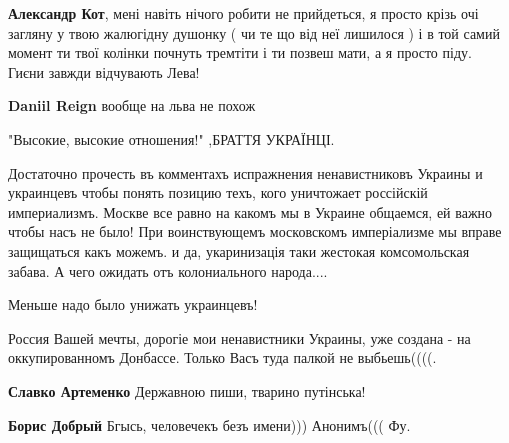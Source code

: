 \begin{itemize}
\begin{itemize}

\textbf{Александр Кот}, мені навіть нічого робити не прийдеться, я просто крізь очі загляну у твою жалюгідну душонку ( чи те що від неї лишилося ) і в той самий момент ти твої колінки почнуть тремтіти і ти позвеш мати, а я просто піду.
Гиєни завжди відчувають Лева!🦁


\textbf{Daniil Reign} вообще на льва не похож


"Высокие, высокие отношения!" ,БРАТТЯ УКРАЇНЦІ.

\end{itemize}



Достаточно прочесть въ комментахъ испражнения ненавистниковъ Украины и
украинцевъ чтобы понять позицию техъ, кого уничтожает россійскій империализмъ.
Москве все равно на какомъ мы в Украине общаемся, ей важно чтобы насъ не было!
При воинствующемъ московскомъ имперіализме мы вправе защищаться какъ можемъ. и
да, укаринизація таки жестокая комсомольская забава. А чего ожидать отъ
колониального народа.... 

Меньше надо было унижать украинцевъ!




Россия Вашей мечты, дорогіе мои ненавистники Украины, уже создана - на
оккупированномъ Донбассе. Только Васъ туда палкой не выбьешь((((.

\begin{itemize}

\textbf{Славко Артеменко} Державною пиши, тварино путінська!


\textbf{Борис Добрый} Бгысь, человечекъ безъ имени))) Анонимъ((( Фу.


\end{itemize}
\end{itemize}
